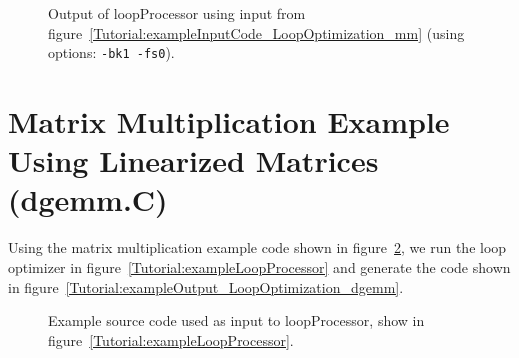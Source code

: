 \begin{figure}[!h]
{\indent
{\mySmallFontSize


\begin{latexonly}
   
\end{latexonly}

\begin{htmlonly}
   
\end{htmlonly}

}
}
\caption{Output of loopProcessor using input from figure~\ref{Tutorial:exampleInputCode_LoopOptimization_mm}
    (using options: {\tt -bk1 -fs0}).}
\label{Tutorial:exampleOutput_LoopOptimization_mm}
\end{figure}


 \clearpage
\section{Matrix Multiplication Example Using Linearized Matrices (dgemm.C)}

   Using the matrix multiplication example code shown in 
figure~\ref{Tutorial:exampleInputCode_LoopOptimization_dgemm}, we run the loop optimizer in
figure~\ref{Tutorial:exampleLoopProcessor} and generate the code shown in 
figure~\ref{Tutorial:exampleOutput_LoopOptimization_dgemm}.

\begin{figure}[!h]
{\indent
{\mySmallFontSize


\begin{latexonly}
   
\end{latexonly}

\begin{htmlonly}
   
\end{htmlonly}

}
}
\caption{Example source code used as input to loopProcessor, show in figure~\ref{Tutorial:exampleLoopProcessor}.}
\label{Tutorial:exampleInputCode_LoopOptimization_dgemm}
\end{figure}

